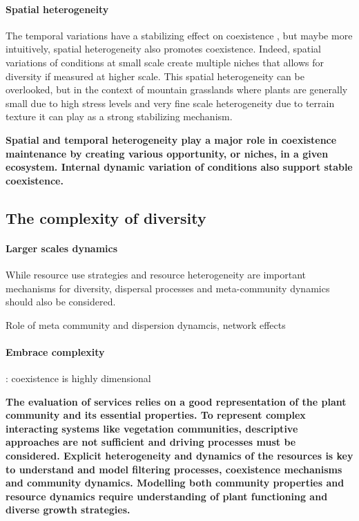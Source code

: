  
\paragraph{Spatial heterogeneity}

The temporal variations have a stabilizing effect on coexistence \cite{tilman_plant_1984}, but maybe more intuitively, spatial heterogeneity also promotes coexistence. Indeed, spatial variations of conditions at small scale create multiple niches that allows for diversity if measured at higher scale. This spatial heterogeneity can be overlooked, but in the context of mountain grasslands where plants are generally small due to high stress levels and very fine scale heterogeneity due to terrain texture it can play as a strong stabilizing mechanism.

%

\textbf{Spatial and temporal heterogeneity play a major role in coexistence maintenance by creating various opportunity, or niches, in a given ecosystem. Internal dynamic variation of conditions also support stable coexistence.}

\subsection{The complexity of diversity}

\paragraph{Larger scales dynamics}

While resource use strategies and resource heterogeneity are important mechanisms for diversity, dispersal processes and meta-community dynamics should also be considered.

Role of meta community and dispersion dynamcis, network effects

\paragraph{Embrace complexity}

\parencite{clark_resolving_2007}: coexistence is highly dimensional


 
 \textbf{The evaluation of services relies on a good representation of the plant community and its essential properties. To represent complex interacting systems like vegetation communities, descriptive approaches are not sufficient and driving processes must be considered. Explicit heterogeneity and dynamics of the resources is key to understand and model filtering processes, coexistence mechanisms and community dynamics. Modelling both community properties and resource dynamics require understanding of plant functioning and diverse growth strategies.}
 

